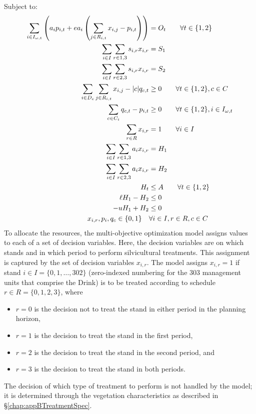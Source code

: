 Subject to:
\begin{align}
\sum_{i\in I_{\omega,t}} \left(a_i p_{i,t} + e a_i \left( \sum_{j \in R_{i,t}} x_{i,j}-p_{i,t} \right) \right) &= O_t \qquad \forall t \in \{1,2\} \notag\\
\sum_{i\in I} \sum_{r\in 1,3} s_{i,r} x_{i,r} &= S_1 \notag\\
\sum_{i\in I} \sum_{r\in 2,3} s_{i,r} x_{i,r} &= S_2 \notag\\
\sum_{i \in D_c} \sum_{j \in R_{i,t}} x_{i,j} - |c| q_{c,t} &\ge 0 \qquad \forall t \in \{1,2\}, c \in C \notag\\
\sum_{c \in C_i} q_{c,t} - p_{i,t} &\ge 0 \qquad \forall t \in \{1,2\}, i \in I_{\omega,t} \notag\\
\sum_{r \in R} x_{i,r} &= 1  \qquad \forall i \in I \notag\\
\sum_{i \in I} \sum_{r \in 1,3} a_i x_{i,r} &= H_1 \notag\\
\sum_{i \in I} \sum_{r \in 2,3} a_i x_{i,r} &= H_2 \notag\\
H_t &\le A \qquad \forall t \in \{1,2\} \notag\\
\ell H_1 - H_2 &\le 0 \notag\\
-u H_1 + H_2 &\le 0 \notag\\
x_{i,r}, p_i, q_c \in \{0,1\} \quad &\forall i \in I, r \in R, c \in C \label{eqn:constraintNonNeg}
\end{align}
To allocate the resources, the multi-objective optimization model assigns values to each of a set of decision variables. Here, the decision variables are on which stands and in which period to perform silvicultural treatments. This assignment is captured by the set of decision variables $x_{i,r}$. The model assigns $x_{i,r} = 1$ if stand $i \in I = \{0,1,\ldots,302\}$ (zero-indexed numbering for the 303 management units that comprise the Drink) is to be treated according to schedule $r \in R = \{0,1,2,3\}$, where
\begin{itemize}
\item $r = 0$ is the decision not to treat the stand in either period in the planning horizon,\item $r = 1$ is the decision to treat the stand in the first period,
\item $r = 2$ is the decision to treat the stand in the second period, and
\item $r = 3$ is the decision to treat the stand in both periods.
\end{itemize}
The decision of which type of treatment to perform is not handled by the model; it is determined through the vegetation characteristics as described in \S \ref{chap:appBTreatmentSpec}.

